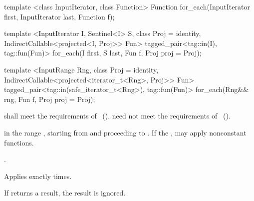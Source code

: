 %
\begin{removedblock}
\begin{itemdecl}
template <class InputIterator, class Function>
  Function for_each(InputIterator first, InputIterator last, Function f);
\end{itemdecl}
\end{removedblock}
\begin{addedblock}
\begin{itemdecl}
template <InputIterator I, Sentinel<I> S, class Proj = identity,
    IndirectCallable<projected<I, Proj>> Fun>
  tagged_pair<tag::in(I), tag::fun(Fun)>
    for_each(I first, S last, Fun f, Proj proj = Proj{});

template <InputRange Rng, class Proj = identity,
    IndirectCallable<projected<iterator_t<Rng>, Proj>> Fun>
  tagged_pair<tag::in(safe_iterator_t<Rng>), tag::fun(Fun)>
    for_each(Rng&& rng, Fun f, Proj proj = Proj{});
\end{itemdecl}
\end{addedblock}

\begin{itemdescr}
\begin{removedblock}
\pnum
\requires {} shall meet the requirements of
~().
\enternote {} need not meet the requirements of
~().\exitnote
\end{removedblock}

\pnum
\effects
{} in the range
,
starting from
and proceeding to
.
\enternote If the ,  may apply
nonconstant functions.\exitnote

\pnum
\returns
{}.

\pnum
\complexity
Applies 
exactly
times.

\pnum
\notes
If  returns a result, the result is ignored.
\end{itemdescr}

